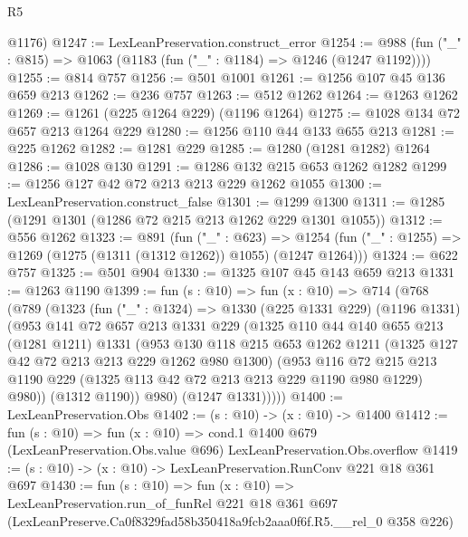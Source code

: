 \begin{lexlean}{R5}
\begin{coremodule}
      @1176)
@1247 := LexLeanPreservation.construct_error
@1254 := @988 (fun ("_" : @815) => @1063 (@1183 (fun ("_" : @1184) => @1246 (@1247 @1192))))
@1255 := @814 @757
@1256 := @501 @1001
@1261 := @1256 @107 @45 @136 @659 @213
@1262 := @236 @757
@1263 := @512 @1262
@1264 := @1263 @1262
@1269 := @1261 (@225 @1264 @229) (@1196 @1264)
@1275 := @1028 @134 @72 @657 @213 @1264 @229
@1280 := @1256 @110 @44 @133 @655 @213
@1281 := @225 @1262
@1282 := @1281 @229
@1285 := @1280 (@1281 @1282) @1264
@1286 := @1028 @130
@1291 := @1286 @132 @215 @653 @1262 @1282
@1299 := @1256 @127 @42 @72 @213 @213 @229 @1262 @1055
@1300 := LexLeanPreservation.construct_false
@1301 := @1299 @1300
@1311 := @1285 (@1291 @1301 (@1286 @72 @215 @213 @1262 @229 @1301 @1055))
@1312 := @556 @1262
@1323 := @891
    (fun ("_" : @623) =>
    @1254 (fun ("_" : @1255) => @1269 (@1275 (@1311 (@1312 @1262)) @1055) (@1247 @1264)))
@1324 := @622 @757
@1325 := @501 @904
@1330 := @1325 @107 @45 @143 @659 @213
@1331 := @1263 @1190
@1399 := fun (s : @10) =>
  fun (x : @10) =>
  @714
    (@768
      (@789
        (@1323
          (fun ("_" : @1324) =>
          @1330
            (@225 @1331 @229)
            (@1196 @1331)
            (@953
              @141
              @72
              @657
              @213
              @1331
              @229
              (@1325
                @110
                @44
                @140
                @655
                @213
                (@1281 @1211)
                @1331
                (@953
                  @130
                  @118
                  @215
                  @653
                  @1262
                  @1211
                  (@1325 @127 @42 @72 @213 @213 @229 @1262 @980 @1300)
                  (@953
                    @116
                    @72
                    @215
                    @213
                    @1190
                    @229
                    (@1325 @113 @42 @72 @213 @213 @229 @1190 @980 @1229)
                    @980))
                (@1312 @1190))
              @980)
            (@1247 @1331)))))
@1400 := LexLeanPreservation.Obs
@1402 := (s : @10) -> (x : @10) -> @1400
@1412 := fun (s : @10) =>
  fun (x : @10) =>
  cond.{1} @1400 @679 (LexLeanPreservation.Obs.value @696) LexLeanPreservation.Obs.overflow
@1419 := (s : @10) -> (x : @10) -> LexLeanPreservation.RunConv @221 @18 @361 @697
@1430 := fun (s : @10) =>
  fun (x : @10) =>
  LexLeanPreservation.run_of_funRel
    @221
    @18
    @361
    @697
    (LexLeanPreserve.Ca0f8329fad58b350418a9fcb2aaa0f6f.R5.__rel_0 @358 @226)
\end{coremodule}
\end{lexlean}

